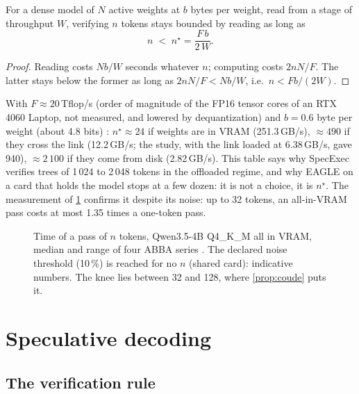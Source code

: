 \begin{proposition}\label{prop:coude}
For a dense model of $N$ active weights at $b$ bytes per weight, read from a stage of throughput $W$, verifying $n$ tokens stays bounded by reading as long as
\begin{equation}\label{eq:coude}
n \;<\; n^\star = \frac{F\, b}{2\, W}.
\end{equation}
\end{proposition}

\begin{proof}
Reading costs $N b / W$ seconds whatever $n$; computing costs $2 n N / F$. The latter stays below the former as long as $2nN/F < Nb/W$, i.e.\ $n < Fb/(2W)$.
\end{proof}

With $F \approx 20$\,Tflop/s (order of magnitude of the FP16 tensor cores of an RTX 4060 Laptop, not measured, and lowered by dequantization) and $b = 0.6$ byte per weight (about 4.8 bits) \calc: $n^\star \approx 24$ if weights are in VRAM (251.3\,GB/s), $\approx 490$ if they cross the link (12.2\,GB/s; the study, with the link loaded at 6.38\,GB/s, gave 940), $\approx 2\,100$ if they come from disk (2.82\,GB/s). This table says why SpecExec verifies trees of 1\,024 to 2\,048 tokens in the offloaded regime, and why EAGLE on a card that holds the model stops at a few dozen: it is not a choice, it is $n^\star$. The measurement of \cref{fig:cn} confirms it despite its noise: up to 32 tokens, an all-in-VRAM pass costs at most 1.35 times a one-token pass.

\begin{figure}[ht]
\centering
\GrapheCn
\caption[The time of a pass of $n$ tokens]{Time of a pass of $n$ tokens, Qwen3.5-4B Q4\_K\_M all in VRAM, median and range of four ABBA series \mes. The declared noise threshold (10\,\%) is reached for no $n$ (shared card): indicative numbers. The knee lies between 32 and 128, where \cref{prop:coude} puts it.}
\label{fig:cn}
\end{figure}

\section{Speculative decoding}\label{sec:speculatif}

\subsection{The verification rule}

